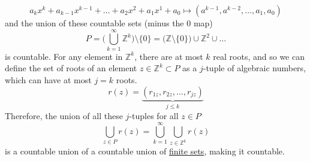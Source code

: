\begin{solution}
\begin{enumerate}
      \begin{equation}
        a_k x^k + a_{k-1} x^{k-1} + \ldots + a_2 x^2 + a_1 x^1 + a_0 \mapsto (a^{k-1}, a^{k-2}, \ldots, a_1, a_0)
      \end{equation}
      and the union of these countable sets (minus the $0$ map) 
      \begin{equation}
        P = \bigg(\bigcup_{k = 1}^\infty \mathbb{Z}^k\bigg) \setminus \{0\} = \big(\mathbb{Z} \setminus \{0\}\big) \cup \mathbb{Z}^2 \cup \ldots
      \end{equation}
      is countable. For any element in $\mathbb{Z}^k$, there are at most $k$ real roots, and so we can define the set of roots of an element $z \in \mathbb{Z}^k \subset P$ as a $j$-tuple of algebraic numbers, which can have at most $j=k$ roots. 
      \begin{equation}
        r(z) = \underbrace{(r_{1z}, r_{2z}, \ldots, r_{jz})}_{j \leq k}
      \end{equation}
      Therefore, the union of all these $j$-tuples for all $z \in P$ 
      \begin{equation}
        \bigcup_{z \in P} r(z) = \bigcup_{k = 1}^\infty \bigcup_{z \in \mathbb{Z}^k} r(z)
      \end{equation}
      is a countable union of a countable union of \hyperref[st-def:finite-set]{finite sets}, making it countable. 
    \end{enumerate}
  \end{solution}

